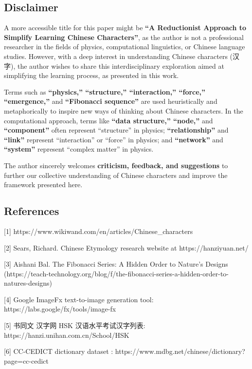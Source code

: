 \documentclass[
]{article}
\begin{document}
\subsection{Disclaimer}\label{disclaimer}

A more accessible title for this paper might be \textbf{``A Reductionist
Approach to Simplify Learning Chinese Characters''}, as the author is
not a professional researcher in the fields of physics, computational
linguistics, or Chinese language studies. However, with a deep interest
in understanding Chinese characters (汉字), the author wishes to share
this interdisciplinary exploration aimed at simplifying the learning
process, as presented in this work.

Terms such as \textbf{``physics,'' ``structure,'' ``interaction,''
``force,'' ``emergence,''} and \textbf{``Fibonacci sequence''} are used
heuristically and metaphorically to inspire new ways of thinking about
Chinese characters. In the computational approach, terms like
\textbf{``data structure,'' ``node,''} and \textbf{``component''} often
represent ``structure'' in physics; \textbf{``relationship''} and
\textbf{``link''} represent ``interaction'' or ``force'' in physics; and
\textbf{``network''} and \textbf{``system''} represent ``complex
matter'' in physics.

The author sincerely welcomes \textbf{criticism, feedback, and
suggestions} to further our collective understanding of Chinese
characters and improve the framework presented here.

\subsection{References}\label{references}

{[}1{]} https://www.wikiwand.com/en/articles/Chinese\_characters

{[}2{]} Sears, Richard. Chinese Etymology research website at
https://hanziyuan.net/

{[}3{]} Aishani Bal. The Fibonacci Series: A Hidden Order to Nature's
Designs
(https://teach-technology.org/blog/f/the-fibonacci-series-a-hidden-order-to-natures-designs)

{[}4{]} Google ImageFx text-to-image generation tool:
https://labs.google/fx/tools/image-fx

{[}5{]} 书同文 汉字网 HSK 汉语水平考试汉字列表:
https://hanzi.unihan.com.cn/School/HSK

{[}6{]} CC-CEDICT dictionary dataset :
https://www.mdbg.net/chinese/dictionary?page=cc-cedict
\end{document}
